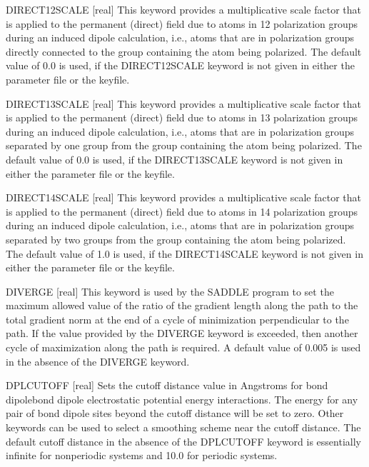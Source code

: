 \documentclass[letterpaper,11pt,english]{sphinxmanual}
\begin{document}
DIRECT\sphinxhyphen{}12\sphinxhyphen{}SCALE {[}real{]}     This keyword provides a multiplicative scale factor that is applied to the permanent (direct) field due to atoms in 1\sphinxhyphen{}2 polarization groups during an induced dipole calculation, i.e., atoms that are in polarization groups directly connected to the group containing the atom being polarized. The default value of 0.0 is used, if the DIRECT\sphinxhyphen{}12\sphinxhyphen{}SCALE keyword is not given in either the parameter file or the keyfile.

DIRECT\sphinxhyphen{}13\sphinxhyphen{}SCALE {[}real{]}     This keyword provides a multiplicative scale factor that is applied to the permanent (direct) field due to atoms in 1\sphinxhyphen{}3 polarization groups during an induced dipole calculation, i.e., atoms that are in polarization groups separated by one group from the group containing the atom being polarized. The default value of 0.0 is used, if the DIRECT\sphinxhyphen{}13\sphinxhyphen{}SCALE keyword is not given in either the parameter file or the keyfile.

DIRECT\sphinxhyphen{}14\sphinxhyphen{}SCALE {[}real{]}     This keyword provides a multiplicative scale factor that is applied to the permanent (direct) field due to atoms in 1\sphinxhyphen{}4 polarization groups during an induced dipole calculation, i.e., atoms that are in polarization groups separated by two groups from the group containing the atom being polarized. The default value of 1.0 is used, if the DIRECT\sphinxhyphen{}14\sphinxhyphen{}SCALE keyword is not given in either the parameter file or the keyfile.

DIVERGE {[}real{]}     This keyword is used by the SADDLE program to set the maximum allowed value of the ratio of the gradient length along the path to the total gradient norm at the end of a cycle of minimization perpendicular to the path. If the value provided by the DIVERGE keyword is exceeded, then another cycle of maximization along the path is required. A default value of 0.005 is used in the absence of the DIVERGE keyword.

DPL\sphinxhyphen{}CUTOFF {[}real{]}     Sets the cutoff distance value in Angstroms for bond dipole\sphinxhyphen{}bond dipole electrostatic potential energy interactions. The energy for any pair of bond dipole sites beyond the cutoff distance will be set to zero. Other keywords can be used to select a smoothing scheme near the cutoff distance. The default cutoff distance in the absence of the DPL\sphinxhyphen{}CUTOFF keyword is essentially infinite for nonperiodic systems and 10.0 for periodic systems.
\end{document}

